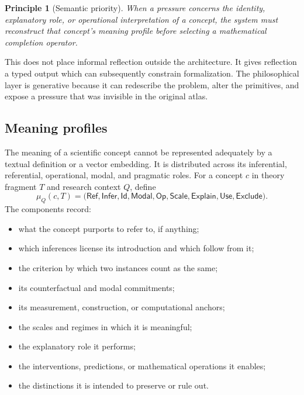 \documentclass[11pt]{article}
\newtheorem{principle}[definition]{Principle}
\begin{document}
\begin{principle}[Semantic priority]
When a pressure concerns the identity, explanatory role, or operational interpretation of a concept,
the system must reconstruct that concept's meaning profile before selecting a mathematical completion
operator.
\end{principle}

This does not place informal reflection outside the architecture. It gives reflection a typed output
which can subsequently constrain formalization. The philosophical layer is generative because it can
redescribe the problem, alter the primitives, and expose a pressure that was invisible in the original
atlas.

\subsection{Meaning profiles}

The meaning of a scientific concept cannot be represented adequately by a textual definition or a
vector embedding. It is distributed across its inferential, referential, operational, modal, and
pragmatic roles. For a concept $c$ in theory fragment $T$ and research context $Q$, define
\begin{equation}
\mu_Q(c,T)=
\bigl(
\mathsf{Ref},\mathsf{Infer},\mathsf{Id},\mathsf{Modal},
\mathsf{Op},\mathsf{Scale},\mathsf{Explain},
\mathsf{Use},\mathsf{Exclude}
\bigr).
\label{eq:meaning-profile}
\end{equation}
The components record:
\begin{itemize}
  \item what the concept purports to refer to, if anything;
  \item which inferences license its introduction and which follow from it;
  \item the criterion by which two instances count as the same;
  \item its counterfactual and modal commitments;
  \item its measurement, construction, or computational anchors;
  \item the scales and regimes in which it is meaningful;
  \item the explanatory role it performs;
  \item the interventions, predictions, or mathematical operations it enables;
  \item the distinctions it is intended to preserve or rule out.
\end{itemize}
\end{document}
